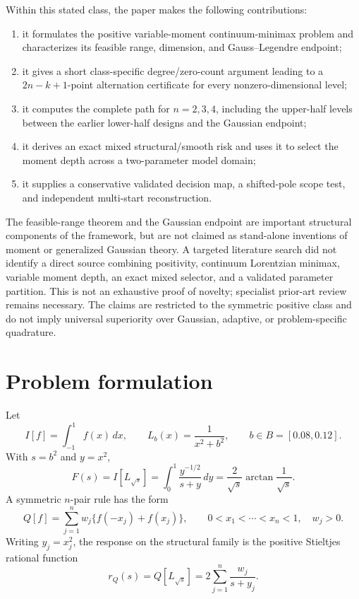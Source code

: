 \documentclass[preprint,12pt]{elsarticle}
\theoremstyle{remark}
\begin{document}
Within this stated class, the paper makes the following contributions:
\begin{enumerate}[label=(\roman*)]
\item it formulates the positive variable-moment continuum-minimax
problem and characterizes its feasible range, dimension, and
Gauss--Legendre endpoint;
\item it gives a short class-specific degree/zero-count argument leading
to a \(2n-k+1\)-point alternation certificate for every
nonzero-dimensional level;
\item it computes the complete path for \(n=2,3,4\), including the
upper-half levels between the earlier lower-half designs and the
Gaussian endpoint;
\item it derives an exact mixed structural/smooth risk and uses it to
select the moment depth across a two-parameter model domain;
\item it supplies a conservative validated decision map, a shifted-pole
scope test, and independent multi-start reconstruction.
\end{enumerate}

The feasible-range theorem and the Gaussian endpoint are important
structural components of the framework, but are not claimed as
stand-alone inventions of moment or generalized Gaussian theory. A
targeted literature search did not identify a direct source combining
positivity, continuum Lorentzian minimax, variable moment depth, an exact
mixed selector, and a validated parameter partition. This is not an
exhaustive proof of novelty; specialist prior-art review remains
necessary. The claims are restricted to the symmetric positive class
and do not imply universal superiority over Gaussian, adaptive, or
problem-specific quadrature.

\section{Problem formulation}

Let
\[
I[f]=\int_{-1}^{1} f(x)\,dx,
\qquad
L_b(x)=\frac{1}{x^2+b^2},
\qquad
b\in B=[0.08,0.12].
\]
With \(s=b^2\) and \(y=x^2\),
\[
F(s)=I[L_{\sqrt{s}}]
=\int_0^1\frac{y^{-1/2}}{s+y}\,dy
=\frac{2}{\sqrt{s}}\arctan\frac{1}{\sqrt{s}}.
\]
A symmetric \(n\)-pair rule has the form
\[
Q[f]=\sum_{j=1}^{n}w_j\{f(-x_j)+f(x_j)\},
\qquad
0<x_1<\cdots<x_n<1,\quad w_j>0.
\]
Writing \(y_j=x_j^2\), the response on the structural family is the
positive Stieltjes rational function
\[
r_Q(s)=Q[L_{\sqrt{s}}]
=2\sum_{j=1}^{n}\frac{w_j}{s+y_j}.
\]
\end{document}
